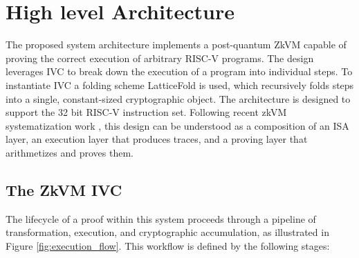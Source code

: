 \section{High level Architecture}\label{sec:arch}

The proposed system architecture implements a post-quantum ZkVM capable of
proving the correct execution of arbitrary RISC-V programs. The design
leverages IVC to break down the execution of a program into individual steps.
To instantiate IVC a folding scheme LatticeFold \cite{LatticeFold} is used,
which recursively folds steps into a single, constant-sized cryptographic object.
The architecture is designed to support the 32 bit RISC-V instruction set.
Following recent zkVM systematization work \cite{SoKZkVMs}, this design can be
understood as a composition of an ISA layer, an execution layer that produces
traces, and a proving layer that arithmetizes and proves them.

\subsection{The ZkVM IVC}

The lifecycle of a proof within this system proceeds through a pipeline of
transformation, execution, and cryptographic accumulation, as illustrated in
Figure \ref{fig:execution_flow}. This workflow is defined by the following stages:


